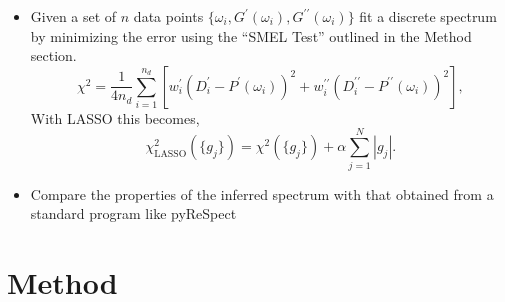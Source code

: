 \documentclass[11pt,letterpaper]{article}
\begin{document}
\begin{itemize}
\item Given a set of $n$ data points $\{\omega_i, G^{\prime}(\omega_i), G^{\prime\prime}(\omega_i)\}$ fit a discrete spectrum by minimizing the error using the ``SMEL Test'' outlined in the Method section.
\begin{equation}
\chi^2 = \dfrac{1}{4 n_d} \sum_{i=1}^{n_d}  \left[w_i^{\prime} \left(D_i^{\prime} - P^{\prime}(\omega_i) \right)^2 + w_i^{\prime\prime} \left(D_i^{\prime\prime} - P^{\prime\prime}(\omega_i) \right)^2 \right],
\label{eqn:chi}
\end{equation}
With LASSO this becomes,
\begin{equation}
\chi^2_\text{LASSO}(\{g_j\}) = \chi^2(\{g_j\}) + \alpha \sum_{j=1}^{N} \left|g_j \right|.
\label{eqn:chilasso}
\end{equation}

\item Compare the properties of the inferred spectrum with that obtained from a standard program like pyReSpect
\end{itemize}


\section{Method}
\end{document}
